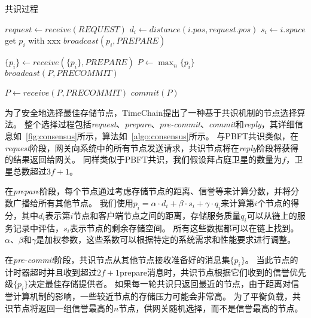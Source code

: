 \begin{algorithm}
	\caption{共识过程}
	\label{algo:consensus}
	\begin{algorithmic}[1]
        \renewcommand{\algorithmicrequire}{ \textbf{Prepare}}
        \REQUIRE
            \STATE $request \gets \textit{receive}(REQUEST)$
                \STATE $d_i \gets \textit{distance}(i.pos, request.pos)$
                \STATE $s_i \gets i.space$
                \STATE get $p_i$ with xxx
                \STATE $\textit{broadcast}(p_i, \textit{PREPARE})$
            \ENDIF

        \renewcommand{\algorithmicrequire}{ \textbf{PreCommit}}
        \REQUIRE
            \STATE $\{p_i\} \gets \textit{receive}(\{p_i\}, \textit{PREPARE})$
                \STATE $P \gets \max_n \{p_i\}$
                \STATE $\textit{broadcast}(P, \textit{PRECOMMIT})$
            \ENDIF

        \renewcommand{\algorithmicrequire}{ \textbf{Commit}}
        \REQUIRE
            \STATE $P \gets \textit{receive}(P, \textit{PRECOMMIT})$
                \STATE $\textit{commit}(P)$
            \ENDIF
	\end{algorithmic}
\end{algorithm}

为了安全地选择最佳存储节点，TimeChain提出了一种基于共识机制的节点选择算法。
整个选择过程包括\textit{request}、\textit{prepare}、\textit{pre-commit}、\textit{commit}和\textit{reply}，其详细信息如~\autoref{fig:consensus}所示，算法如~\autoref{algo:consensus}所示。
与PBFT共识类似，在\textit{request}阶段，网关向系统中的所有节点发送请求，共识节点将在\textit{reply}阶段将获得的结果返回给网关。
同样类似于PBFT共识，我们假设拜占庭卫星的数量为$f$，卫星总数超过$3f+1$。

在\textit{prepare}阶段，每个节点通过考虑存储节点的距离、信誉等来计算分数，并将分数广播给所有其他节点。
我们使用$p_i=\alpha\cdot d_i+\beta\cdot s_i+\gamma\cdot q_i$来计算第$i$个节点的得分，其中$d_i$表示第$i$节点和客户端节点之间的距离，存储服务质量$q_i$可以从链上的服务记录中评估，$s_i$表示节点的剩余存储空间。
所有这些数据都可以在链上找到。
$\alpha$、$\beta$和$\gamma$是加权参数，这些系数可以根据特定的系统需求和性能要求进行调整。

在\textit{pre-commit}阶段，共识节点从其他节点接收准备好的消息集$\{p_i\}$。
当此节点的计时器超时并且收到超过$2f+1$prepare消息时，共识节点根据它们收到的信誉优先级$\{p_i\}$决定最佳存储提供者。
如果每一轮共识只返回最近的节点，由于距离对信誉计算机制的影响，一些较近节点的存储压力可能会非常高。
为了平衡负载，共识节点将返回一组信誉最高的$n$节点，供网关随机选择，而不是信誉最高的节点。

